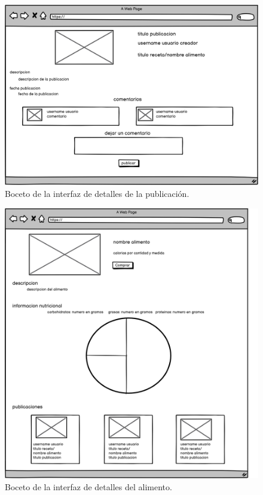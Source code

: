      \begin{figure}[H]
    \centering
    \includegraphics[scale=0.20]{img/detalle-publicacion.jpg}
    \caption{Boceto de la interfaz de detalles de la publicación.}
    \label{fig:detalle-publicacion}
\end{figure}
    
     

     \begin{figure}[H]
    \centering
    \includegraphics[scale=0.20]{img/detalle-alimento.jpg}
    \caption{Boceto de la interfaz de detalles del alimento.}
    \label{fig:detalle-alimento}
\end{figure}
    
